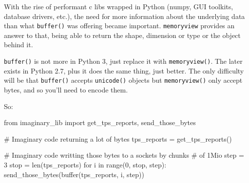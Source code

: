 With the rise of performant c libs wrapped in Python (numpy, GUI toolkits, database drivers, etc.), the need for more information about the underlying data than what \lstinline{buffer()} was offering became important. \lstinline{memoryview} provides an answer to that, being able to return the shape, dimension or type or the object behind it.

\lstinline{buffer()} is not more in Python 3, just replace it with \lstinline{memoryview()}. The later exists in Python 2.7, plus it does the same thing, just better. The only difficulty will be that \lstinline{buffer()} accepts \lstinline{unicode()} objects but \lstinline{memoryview()} only accept bytes, and so you'll need to encode them.

So:

\begin{py2}
from imaginary_lib import get_tps_reports, send_those_bytes

# Imaginary code returning a lot of bytes
tps_reports = get_tps_reports()

# Imaginary code writting those bytes to a sockets by chunks
# of 1Mio
step = 3
stop = len(tps_reports)
for i in range(0, stop, step):
    send_those_bytes(buffer(tps_reports, i, step))

\end{py2}
